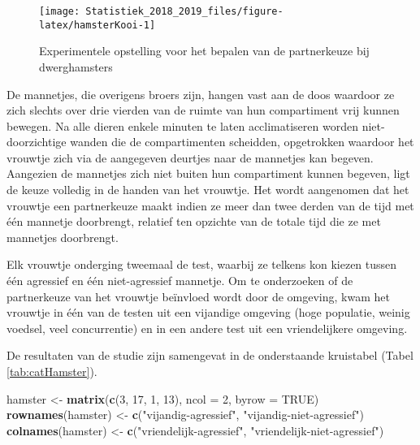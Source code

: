 \documentclass[12pt,dutch,coursenotes]{book}
\newenvironment{Shaded}{\begin{snugshade}}{\end{snugshade}}
\newcommand{\KeywordTok}[1]{\textcolor[rgb]{0.13,0.29,0.53}{\textbf{#1}}}
\newcommand{\DataTypeTok}[1]{\textcolor[rgb]{0.13,0.29,0.53}{#1}}
\newcommand{\DecValTok}[1]{\textcolor[rgb]{0.00,0.00,0.81}{#1}}
\newcommand{\StringTok}[1]{\textcolor[rgb]{0.31,0.60,0.02}{#1}}
\newcommand{\OtherTok}[1]{\textcolor[rgb]{0.56,0.35,0.01}{#1}}
\newcommand{\NormalTok}[1]{#1}
\theoremstyle{definition}
\theoremstyle{definition}
\theoremstyle{definition}
\theoremstyle{remark}
\begin{document}
\begin{figure}

{\centering \texttt{[image: Statistiek\_2018\_2019\_files/figure-latex/hamsterKooi-1]} 

}

\caption{Experimentele opstelling voor het bepalen van de partnerkeuze bij dwerghamsters}\label{fig:hamsterKooi}
\end{figure}

De mannetjes, die overigens broers zijn, hangen vast aan de doos
waardoor ze zich slechts over drie vierden van de ruimte van hun
compartiment vrij kunnen bewegen. Na alle dieren enkele minuten te laten
acclimatiseren worden niet-doorzichtige wanden die de compartimenten
scheidden, opgetrokken waardoor het vrouwtje zich via de aangegeven
deurtjes naar de mannetjes kan begeven. Aangezien de mannetjes zich niet
buiten hun compartiment kunnen begeven, ligt de keuze volledig in de
handen van het vrouwtje. Het wordt aangenomen dat het vrouwtje een
partnerkeuze maakt indien ze meer dan twee derden van de tijd met één
mannetje doorbrengt, relatief ten opzichte van de totale tijd die ze met
mannetjes doorbrengt.

Elk vrouwtje onderging tweemaal de test, waarbij ze telkens kon kiezen
tussen één agressief en één niet-agressief mannetje. Om te onderzoeken
of de partnerkeuze van het vrouwtje beïnvloed wordt door de omgeving,
kwam het vrouwtje in één van de testen uit een vijandige omgeving (hoge
populatie, weinig voedsel, veel concurrentie) en in een andere test uit
een vriendelijkere omgeving.

De resultaten van de studie zijn samengevat in de onderstaande
kruistabel (Tabel \ref{tab:catHamster}).

\begin{Shaded}
\begin{Highlighting}[]
\NormalTok{hamster <-}\StringTok{ }\KeywordTok{matrix}\NormalTok{(}\KeywordTok{c}\NormalTok{(}\DecValTok{3}\NormalTok{, }\DecValTok{17}\NormalTok{, }\DecValTok{1}\NormalTok{, }\DecValTok{13}\NormalTok{), }\DataTypeTok{ncol =} \DecValTok{2}\NormalTok{, }\DataTypeTok{byrow =} \OtherTok{TRUE}\NormalTok{)}
\KeywordTok{rownames}\NormalTok{(hamster) <-}\StringTok{ }\KeywordTok{c}\NormalTok{(}\StringTok{"vijandig-agressief"}\NormalTok{, }\StringTok{"vijandig-niet-agressief"}\NormalTok{)}
\KeywordTok{colnames}\NormalTok{(hamster) <-}\StringTok{ }\KeywordTok{c}\NormalTok{(}\StringTok{"vriendelijk-agressief"}\NormalTok{, }\StringTok{"vriendelijk-niet-agressief"}\NormalTok{)}
\end{Highlighting}
\end{Shaded}
\end{document}
